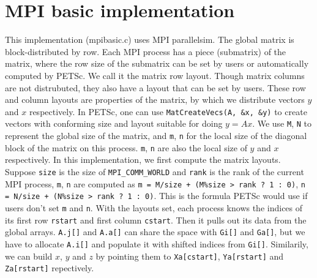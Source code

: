 \documentclass[submission]{eptcs}
\begin{document}
\section{MPI basic implementation}
\label{sec:mpibasic}
This implementation (mpibasic.c) uses MPI parallelsim.
The global matrix is block-distributed by row. Each MPI process has a piece (submatrix) of the
matrix, where the row size of the submatrix can be set by users
or automatically computed by PETSc. We call it the matrix row layout.
Though matrix columns are not distrubuted, they also have a layout that can be set by users.
These row and column layouts are properties of the matrix, by which we distribute vectors $y$ and $x$ respectively.
In PETSc, one can use {\tt MatCreateVecs(A, \&x, \&y)} to create
vectors with conforming size and layout suitable for doing $y = Ax$.
We use {\tt M}, {\tt N} to represent the global size of the matrix,
and {\tt m}, {\tt n} for the local size of the diagonal block of the matrix
on this process. {\tt m}, {\tt n} are also the local size of $y$ and $x$ respectively.
In this implementation, we first compute the matrix layouts.
Suppose {\tt size} is the size of {\tt MPI_COMM_WORLD} and {\tt rank} is the rank of the current MPI process,
{\tt m}, {\tt n} are computed as \verb|m = M/size + (M%size > rank ? 1 : 0)|,
\verb|n = N/size + (N%size > rank ? 1 : 0)|. This is the formula PETSc would use
if users don't set {\tt m} and {\tt n}.
With the layouts set,
each process knows the indices of its first row {\tt rstart} and first column {\tt cstart}.
Then it pulls out its data from the global arrays.
{\tt A.j[]} and {\tt A.a[]} can share the space with {\tt Gi[]} and {\tt Ga[]}, but we
have to allocate {\tt A.i[]} and populate it with shifted indices from {\tt Gi[]}.
Similarily, we can build $x$, $y$ and $z$ by pointing them to
{\tt Xa[cstart]}, {\tt Ya[rstart]} and {\tt Za[rstart]} repectively.
\end{document}
